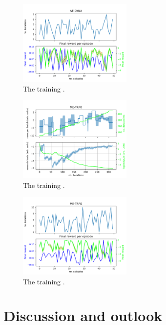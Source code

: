 \documentclass[
 reprint,
 amsmath,amssymb,amsfonts,clevref,
 aps,
prstab,
]{revtex4-2}
\begin{document}
\begin{figure}[!h]
	\centering
	\includegraphics*[width=0.5\textwidth]{Figures/AE-DYNA_verification.pdf}
	\caption{The training .}
	\label{fig:AE-DYNA_verification}
\end{figure}


\begin{figure}[!h]
	\centering
	\includegraphics*[width=0.5\textwidth]{Figures/ME-TRPO_observables.pdf}
	\caption{The training .}
	\label{fig:ME-TRPO_observables}
\end{figure}
\begin{figure}[!h]
	\centering
	\includegraphics*[width=0.5\textwidth]{Figures/ME-TRPO_verification.pdf}
	\caption{The training .}
	\label{fig:ME-TRPO_verification}
\end{figure}


\section{Discussion and outlook}
\end{document}
